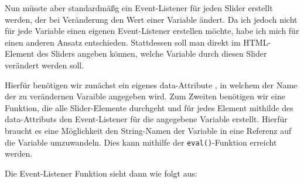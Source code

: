 Nun müsste aber standardmäßg ein Event-Listener für jeden Slider erstellt werden, der bei Veränderung den Wert einer Variable ändert. Da ich jedoch nicht für jede Variable einen eigenen Event-Listener erstellen möchte, habe ich mich für einen anderen Ansatz entschieden. Stattdessen soll man direkt im HTML-Element des Sliders angeben können, welche Variable durch diesen Slider verändert werden soll.

Hierfür benötigen wir zunächst ein eigenes data-Attribute , in welchem der Name der zu verändernen Varaible angegeben wird. Zum Zweiten benötigen wir eine Funktion, die alle Slider-Elemente durchgeht und für jedes Element mithilde des data-Attributs den Event-Listener für die angegebene Variable erstellt. Hierfür braucht es eine Möglichkeit den String-Namen der Variable in eine Referenz auf die Variable umzuwandeln. Dies kann mithilfe der \texttt{eval()}-Funktion erreicht werden.

Die Event-Listener Funktion sieht dann wie folgt aus:

